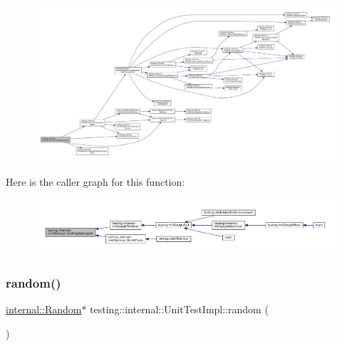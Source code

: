 \begin{figure}[H]
\begin{center}
\leavevmode
\includegraphics[width=350pt]{classtesting_1_1internal_1_1UnitTestImpl_a772894193104b1b2516f16e6ff813168_cgraph}
\end{center}
\end{figure}
Here is the caller graph for this function\+:
\nopagebreak
\begin{figure}[H]
\begin{center}
\leavevmode
\includegraphics[width=350pt]{classtesting_1_1internal_1_1UnitTestImpl_a772894193104b1b2516f16e6ff813168_icgraph}
\end{center}
\end{figure}
\mbox{\label{classtesting_1_1internal_1_1UnitTestImpl_ab3b45b5eb4d583219a3602011ea44347}} 
\subsubsection{\texorpdfstring{random()}{random()}}
{\footnotesize\ttfamily \hyperlink{classtesting_1_1internal_1_1Random}{internal\+::\+Random}$\ast$ testing\+::internal\+::\+Unit\+Test\+Impl\+::random (\begin{DoxyParamCaption}{ }\end{DoxyParamCaption})\hspace{0.3cm}{\ttfamily [inline]}}



